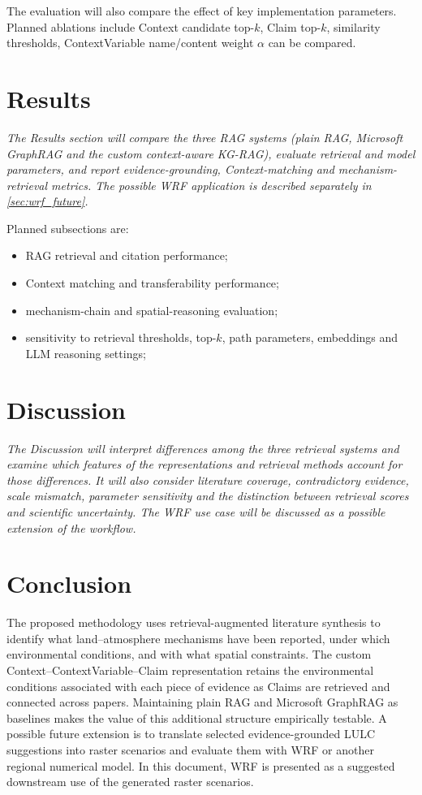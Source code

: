 \documentclass[10pt,twocolumn]{article}
\begin{document}
The evaluation will also compare the effect of key implementation parameters. Planned ablations include Context candidate top-$k$, Claim top-$k$, similarity thresholds, ContextVariable name/content weight $\alpha$ can be compared.


\section{Results}

\emph{The Results section will compare the three RAG systems (plain RAG, Microsoft GraphRAG and the custom context-aware KG-RAG), evaluate retrieval and model parameters, and report evidence-grounding, Context-matching and mechanism-retrieval metrics. The possible WRF application is described separately in \cref{sec:wrf_future}.}

Planned subsections are:
\begin{itemize}
  \item RAG retrieval and citation performance;
  \item Context matching and transferability performance;
  \item mechanism-chain and spatial-reasoning evaluation;
  \item sensitivity to retrieval thresholds, top-$k$, path parameters, embeddings and LLM reasoning settings;
\end{itemize}

\section{Discussion}

\emph{The Discussion will interpret differences among the three retrieval systems and examine which features of the representations and retrieval methods account for those differences. It will also consider literature coverage, contradictory evidence, scale mismatch, parameter sensitivity and the distinction between retrieval scores and scientific uncertainty. The WRF use case will be discussed as a possible extension of the workflow.}
\section{Conclusion}

The proposed methodology uses retrieval-augmented literature synthesis to identify what land--atmosphere mechanisms have been reported, under which environmental conditions, and with what spatial constraints. The custom Context--ContextVariable--Claim representation retains the environmental conditions associated with each piece of evidence as Claims are retrieved and connected across papers. Maintaining plain RAG and Microsoft GraphRAG as baselines makes the value of this additional structure empirically testable. A possible future extension is to translate selected evidence-grounded LULC suggestions into raster scenarios and evaluate them with WRF or another regional numerical model. In this document, WRF is presented as a suggested downstream use of the generated raster scenarios.
\end{document}
